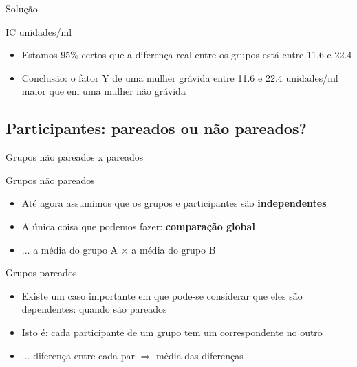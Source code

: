 \documentclass{beamer}
\begin{document}
\begin{frame}{Solução}
    \begin{exampleblock}{IC}
    \centering
    [11.6, 22.4] unidades/ml
  \end{exampleblock}
  \begin{itemize}
  \item Estamos 95\% certos que a diferença real entre os grupos está entre 11.6 e 22.4
  \item Conclusão: o fator Y de uma mulher grávida entre 11.6 e 22.4 unidades/ml maior que em uma mulher não grávida
  \end{itemize}
\end{frame}

\subsection{Participantes: pareados ou não pareados?}

\begin{frame}{Grupos não pareados x pareados}
  \begin{block}{Grupos não pareados}
    \begin{itemize}
    \item Até agora assumimos que os grupos e participantes são {\bf independentes}
    \item A única coisa que podemos fazer: {\bf comparação global}
    \item ... a média do grupo A $\times$ a média do grupo B
    \end{itemize}
  \end{block}
  \begin{block}{Grupos pareados}
    \begin{itemize}
    \item Existe um caso importante em que pode-se considerar que eles são dependentes: quando são pareados
    \item Isto é: cada participante de um grupo tem um correspondente no outro
    \item ... diferença entre cada par $\Rightarrow$ média das diferenças
    \end{itemize}
  \end{block}
\end{frame}
\end{document}
